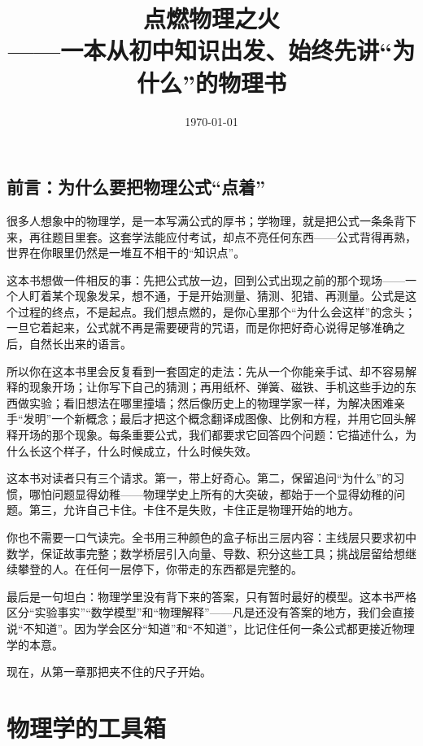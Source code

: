 \documentclass[fontset=fandol,12pt,openany]{ctexbook}
\title{点燃物理之火\\{\large ——一本从初中知识出发、始终先讲“为什么”的物理书}}
\author{}
\date{\today}
\begin{document}
\frontmatter
\maketitle

\chapter*{前言：为什么要把物理公式“点着”}

很多人想象中的物理学，是一本写满公式的厚书；学物理，就是把公式一条条背下来，再往题目里套。这套学法能应付考试，却点不亮任何东西——公式背得再熟，世界在你眼里仍然是一堆互不相干的“知识点”。

这本书想做一件相反的事：先把公式放一边，回到公式出现之前的那个现场——一个人盯着某个现象发呆，想不通，于是开始测量、猜测、犯错、再测量。公式是这个过程的终点，不是起点。我们想点燃的，是你心里那个“为什么会这样”的念头；一旦它着起来，公式就不再是需要硬背的咒语，而是你把好奇心说得足够准确之后，自然长出来的语言。

所以你在这本书里会反复看到一套固定的走法：先从一个你能亲手试、却不容易解释的现象开场；让你写下自己的猜测；再用纸杯、弹簧、磁铁、手机这些手边的东西做实验；看旧想法在哪里撞墙；然后像历史上的物理学家一样，为解决困难亲手“发明”一个新概念；最后才把这个概念翻译成图像、比例和方程，并用它回头解释开场的那个现象。每条重要公式，我们都要求它回答四个问题：它描述什么，为什么长这个样子，什么时候成立，什么时候失效。

这本书对读者只有三个请求。第一，带上好奇心。第二，保留追问“为什么”的习惯，哪怕问题显得幼稚——物理学史上所有的大突破，都始于一个显得幼稚的问题。第三，允许自己卡住。卡住不是失败，卡住正是物理开始的地方。

你也不需要一口气读完。全书用三种颜色的盒子标出三层内容：主线层只要求初中数学，保证故事完整；数学桥层引入向量、导数、积分这些工具；挑战层留给想继续攀登的人。在任何一层停下，你带走的东西都是完整的。

最后是一句坦白：物理学里没有背下来的答案，只有暂时最好的模型。这本书严格区分“实验事实”“数学模型”和“物理解释”——凡是还没有答案的地方，我们会直接说“不知道”。因为学会区分“知道”和“不知道”，比记住任何一条公式都更接近物理学的本意。

现在，从第一章那把夹不住的尺子开始。

\tableofcontents
\mainmatter

\part{物理学的工具箱}




\end{document}
